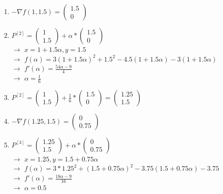 \documentclass[a4paper, 11pt]{article}
\begin{document}
\begin{enumerate}
	 \item
	$-{\nabla}f(1,1.5) = \left( \begin{array}{c} 1.5 \\  0 \end{array} \right)$
	
	\item
	$P^{[2]}=\left( \begin{array}{c} 1 \\ 1.5 \end{array} \right) + \alpha * \left( \begin{array}{c} 1.5 \\ 0 \end{array} \right)$\\ $\rightarrow$ $x=1+1.5\alpha, y=1.5$\\ $\rightarrow$ $f(\alpha)=3(1+1.5\alpha)^2+1.5^2-4.5(1+1.5\alpha)-3(1+1.5\alpha)$\\ $\rightarrow$ $f'(\alpha)=\frac{54\alpha-9}{4}$\\ $\rightarrow$ $\alpha=\frac{1}{6}$
	
	\item
	$P^{[2]}=\left( \begin{array}{c} 1 \\ 1.5 \end{array} \right) + \frac{1}{6} * \left( \begin{array}{c} 1.5 \\ 0 \end{array} \right) = \left( \begin{array}{c} 1.25 \\ 1.5 \end{array} \right)$
	
	\item
	$-{\nabla}f(1.25,1.5) = \left( \begin{array}{c} 0 \\  0.75 \end{array} \right)$
	
	\item
	$P^{[3]}=\left( \begin{array}{c} 1.25 \\ 1.5 \end{array} \right) + \alpha * \left( \begin{array}{c}  0 \\ 0.75 \end{array} \right)$\\ $\rightarrow$ $x=1.25, y=1.5+0.75\alpha$\\ $\rightarrow$ $f(\alpha)=3*1.25^2+(1.5+0.75\alpha)^2-3.75(1.5+0.75\alpha)-3.75$\\ $\rightarrow$ $f'(\alpha)=\frac{18\alpha-9}{16}$\\ $\rightarrow$ $\alpha=0.5$
	

\end{enumerate}
\end{document}
